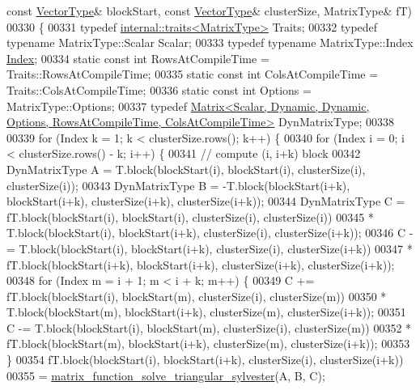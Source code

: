 \begin{DoxyCode}
{      const} \hyperlink{struct_vector_type}{VectorType}& blockStart, \textcolor{keyword}{const} \hyperlink{struct_vector_type}{VectorType}& clusterSize, MatrixType& fT)
00330 \{ 
00331   \textcolor{keyword}{typedef} \hyperlink{struct_eigen_1_1internal_1_1traits}{internal::traits<MatrixType>} Traits;
00332   \textcolor{keyword}{typedef} \textcolor{keyword}{typename} MatrixType::Scalar Scalar;
00333   \textcolor{keyword}{typedef} \textcolor{keyword}{typename} MatrixType::Index \hyperlink{namespace_eigen_a62e77e0933482dafde8fe197d9a2cfde}{Index};
00334   \textcolor{keyword}{static} \textcolor{keyword}{const} \textcolor{keywordtype}{int} RowsAtCompileTime = Traits::RowsAtCompileTime;
00335   \textcolor{keyword}{static} \textcolor{keyword}{const} \textcolor{keywordtype}{int} ColsAtCompileTime = Traits::ColsAtCompileTime;
00336   \textcolor{keyword}{static} \textcolor{keyword}{const} \textcolor{keywordtype}{int} Options = MatrixType::Options;
00337   \textcolor{keyword}{typedef} 
      \hyperlink{group___core___module_class_eigen_1_1_matrix}{Matrix<Scalar, Dynamic, Dynamic, Options, RowsAtCompileTime, ColsAtCompileTime>}
       DynMatrixType;
00338 
00339   \textcolor{keywordflow}{for} (Index k = 1; k < clusterSize.rows(); k++) \{
00340     \textcolor{keywordflow}{for} (Index i = 0; i < clusterSize.rows() - k; i++) \{
00341       \textcolor{comment}{// compute (i, i+k) block}
00342       DynMatrixType A = T.block(blockStart(i), blockStart(i), clusterSize(i), clusterSize(i));
00343       DynMatrixType B = -T.block(blockStart(i+k), blockStart(i+k), clusterSize(i+k), clusterSize(i+k));
00344       DynMatrixType C = fT.block(blockStart(i), blockStart(i), clusterSize(i), clusterSize(i))
00345         * T.block(blockStart(i), blockStart(i+k), clusterSize(i), clusterSize(i+k));
00346       C -= T.block(blockStart(i), blockStart(i+k), clusterSize(i), clusterSize(i+k))
00347         * fT.block(blockStart(i+k), blockStart(i+k), clusterSize(i+k), clusterSize(i+k));
00348       \textcolor{keywordflow}{for} (Index m = i + 1; m < i + k; m++) \{
00349         C += fT.block(blockStart(i), blockStart(m), clusterSize(i), clusterSize(m))
00350           * T.block(blockStart(m), blockStart(i+k), clusterSize(m), clusterSize(i+k));
00351         C -= T.block(blockStart(i), blockStart(m), clusterSize(i), clusterSize(m))
00352           * fT.block(blockStart(m), blockStart(i+k), clusterSize(m), clusterSize(i+k));
00353       \}
00354       fT.block(blockStart(i), blockStart(i+k), clusterSize(i), clusterSize(i+k))
00355         = \hyperlink{namespace_eigen_1_1internal_a9f7e5b9803071057e7ed4e887da4a1bb}{matrix\_function\_solve\_triangular\_sylvester}(A, B, C);

\end{DoxyCode}
